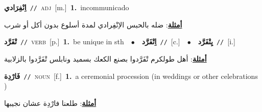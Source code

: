 \documentclass[10pt,a4paper,twoside]{article} %
\begin{document}
\begin{multicols}{2}
{\setlength\topsep{0pt}\textbf{\foreignlanguage{arabic}{اِنْفِرَادي}}\ {\color{gray}\texttt{//}\color{black}}\ \textsc{adj}\ [m.]\ \textbf{1.}~incommunicado\  \begin{flushright}\color{gray}\foreignlanguage{arabic}{\textbf{\underline{\foreignlanguage{arabic}{أمثلة}}}: ضله بالحبس الاِنْفِرادي لمدة أسلوع بدون أكل أو شرب}\end{flushright}\color{black}} \vspace{2mm}

{\setlength\topsep{0pt}\textbf{\foreignlanguage{arabic}{تْفَرَّد}}\ {\color{gray}\texttt{//}\color{black}}\ \textsc{verb}\ [p.]\ \textbf{1.}~be unique in sth\ \ $\bullet$\ \ \setlength\topsep{0pt}\textbf{\foreignlanguage{arabic}{اِتْفَرَّد}}\ {\color{gray}\texttt{//}\color{black}}\ [c.]\ \ $\bullet$\ \ \setlength\topsep{0pt}\textbf{\foreignlanguage{arabic}{يِتْفَرَّد}}\ {\color{gray}\texttt{//}\color{black}}\ [i.]\  \begin{flushright}\color{gray}\foreignlanguage{arabic}{\textbf{\underline{\foreignlanguage{arabic}{أمثلة}}}: أهل طولكرم تْفَرَّدوا بصنع الكعك بسميد ونابلس تْفَرَّدوا بالزلابية}\end{flushright}\color{black}} \vspace{2mm}

{\setlength\topsep{0pt}\textbf{\foreignlanguage{arabic}{فَارْدِة}}\ {\color{gray}\texttt{//}\color{black}}\ \textsc{noun}\ [f.]\ \textbf{1.}~a ceremonial procession (in weddings or other celebrations )\  \begin{flushright}\color{gray}\foreignlanguage{arabic}{\textbf{\underline{\foreignlanguage{arabic}{أمثلة}}}: طلعنا فارْدِة عشان نجيبها}\end{flushright}\color{black}} \vspace{2mm}


\end{multicols}
\end{document}
